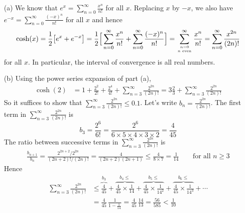 \begin{solution} (a) We know that
$e^x = \sum\limits_{n=0}^\infty \frac{x^n}{n!}$ for all $x$.
Replacing $x$ by $-x$, we also have
$e^{-x} = \sum\limits_{n=0}^\infty \frac{(-x)^n}{n!}$ for all $x$
and hence
\begin{align*}
\cosh(x) =\frac{1}{2}\big[e^x+e^{-x}\big]
         =\frac{1}{2}\Big[\sum_{n=0}^\infty \frac{x^n}{n!}
                         + \sum_{n=0}^\infty \frac{(-x)^n}{n!}\Big]
         = \sum_{\genfrac{}{}{0pt}{}{n=0}{n\text{ even}}}^\infty\frac{x^n}{n!}
         = \sum_{n=0}^\infty\frac{x^{2n}}{(2n)!}
\end{align*}
for all $x$. In particular, the interval of convergence is all real numbers.

\noindent (b) Using the power series expansion of part (a),
\begin{align*}
\cosh(2) &= 1 +\frac{2^2}{2!}+\frac{2^4}{4!}
                    +\sum_{n=3}^\infty\frac{2^{2n}}{(2n)!}
         = 3\frac{2}{3}
                    +\sum_{n=3}^\infty\frac{2^{2n}}{(2n)!}
\end{align*}
So it suffices to show that $\sum_{n=3}^\infty\frac{2^{2n}}{(2n)!}\le 0.1$.
Let's write $b_n = \frac{2^{2n}}{(2n)!}$. The first term in
$\sum_{n=3}^\infty\frac{2^{2n}}{(2n)!}$ is
\begin{equation*}
b_3 = \frac{2^6}{6!}
    = \frac{2^6}{6 \times 5 \times 4 \times 3\times 2}
    = \frac{4}{45}
\end{equation*}
The ratio between successive terms in $\sum_{n=3}^\infty\frac{2^{2n}}{(2n)!}$
is
\begin{align*}
\frac{b_{n+1}}{b_n}
= \frac{2^{2n+2}/2^{2n}}{(2n+2)!/(2n)!}
=\frac{4}{(2n+2)(2n+1)}
\le \frac{4}{8\times 7}
=\frac{1}{14}\qquad
\text{for all }n\ge 3
\end{align*}
Hence
\begin{align*}
\sum_{n=3}^\infty\frac{2^{2n}}{(2n)!}
&\le \overbrace{\frac{4}{45}}^{b_3}
    + \overbrace{\frac{4}{45}\times \frac{1}{14}}^{b_4\le}
    + \overbrace{\frac{4}{45}\times \frac{1}{14^2}}^{b_5\le}
    + \overbrace{\frac{4}{45}\times \frac{1}{14^3}}^{b_6\le}
    + \cdots\\
&=\frac{4}{45}\,\frac{1}{1-\frac{1}{14}}
=\frac{4}{45}\,\frac{14}{13}
=\frac{56}{585}<\frac{1}{10}
\end{align*}



\end{solution}
